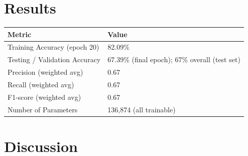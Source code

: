 \documentclass[11pt]{article}
\begin{document}
\section{Results}

\begin{center}
\begin{tabular}{ll}
\toprule
\textbf{Metric} & \textbf{Value} \\
\midrule
Training Accuracy (epoch 20)   & 82.09\% \\
Testing / Validation Accuracy  & 67.39\% (final epoch); 67\% overall (test set) \\
Precision (weighted avg)       & 0.67 \\
Recall (weighted avg)          & 0.67 \\
F1-score (weighted avg)        & 0.67 \\
Number of Parameters           & 136{,}874 (all trainable) \\
\bottomrule
\end{tabular}
\end{center}

\section{Discussion}
\end{document}

